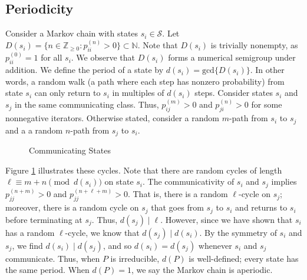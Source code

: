 \documentclass[12pt]{article}
\newcommand{\iterate}[2]{#1^{(#2)}}
\begin{document}
\subsection{Periodicity}
Consider a Markov chain with states $s_i \in \mathcal{S}$. Let
$D(s_i) = \{n\in \mathbb{Z}_{\geq 0} : \iterate{p}{n}_{ii} > 0 \} \subset
\mathbb{N}$. Note that $D(s_i)$ is trivially nonempty, as
$\iterate{p}{0}_{ii} = 1$ for all $s_i$. We observe that $D(s_i)$ forms a
numerical semigroup under addition. We define the period of a state by
$d(s_i)=\text{gcd}\{D(s_i)\}$. In other words, a random walk (a path where each
step has nonzero probability) from state $s_i$ can only return to $s_i$ in
multiples of $d(s_i)$ steps. Consider states $s_i$ and $s_j$ in the same
communicating class. Thus, $\iterate{p}{m}_{ij} > 0$ and
$\iterate{p}{n}_{ji} > 0$ for some nonnegative iterators. Otherwise stated,
consider a random $m$-path from $s_i$ to $s_j$ and a a random $n$-path from
$s_j$ to $s_i$.
\begin{figure}[h]
  \centering {}
  \caption{Communicating States}
  \label{fig:markov}
\end{figure}

Figure \ref{fig:markov} illustrates these cycles. Note that there are random
cycles of length $\ell \equiv m+n \pmod{d(s_i)}$ on state $s_i$. The
communicativity of $s_i$ and $s_j$ implies $\iterate{p}{n+m}_{jj} > 0$ and
$\iterate{p}{n + \ell + m}_{jj} > 0$. That is, there is a random $\ell$-cycle on
$s_j$; moreover, there is a random cycle on $s_j$ that goes from $s_j$ to $s_i$
and returns to $s_i$ before terminating at $s_j$. Thus, $d(s_j) \mid \ell$.
However, since we have shown that $s_i$ has a random $\ell$-cycle, we know that
$d(s_j) \mid d(s_i)$. By the symmetry of $s_i$ and $s_j$, we find
$d(s_i) \mid d(s_j)$, and so $d(s_i) = d(s_j)$ whenever $s_i$ and $s_j$
communicate. Thus, when $P$ is irreducible, $d(P)$ is well-defined; every state
has the same period. When $d(P) = 1$, we say the Markov chain is aperiodic.
\end{document}
